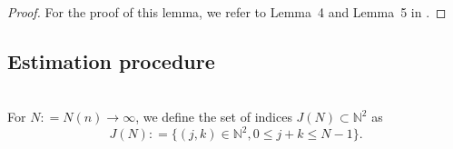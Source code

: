 \documentclass[a4paper]{amsart}
\newcommand{\deq}{\mathrel{\mathop:} = } %
\begin{document}
\begin{proof}  
For the proof of this lemma, we refer to Lemma~4 and Lemma~5 in \cite{ABM}.     
   
\end{proof}

\subsection{Estimation procedure}
\label{Estimation.procedure}
\noindent\\


 For $N \deq N(n) \rightarrow \infty$, we define the set of indices
$J(N)\subset\mathbb{N}^2$ as
 \begin{equation}
 \label{eqJ}
J(N)\deq\{(j,k)\in\mathbb{N}^2,0\leq j+k \leq N-1\}.
\end{equation}
\end{document}
